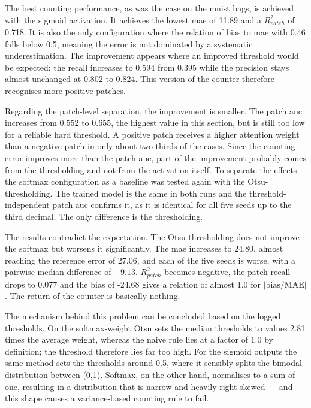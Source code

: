 \documentclass[12pt,parskip = half, DIV=classic,listof=totoc]{scrartcl}
\begin{document}
			The best counting performance, as was the case on the \ac{mnist} bags, is achieved with the sigmoid activation. It achieves
			the lowest \ac{mae} of 11.89 and a $R^2_{patch}$ of 0.718. It is also the only configuration where the relation of bias to \ac{mae} with 0.46
			falls below 0.5, meaning the error is not dominated by a systematic underestimation. The improvement appears
			where an improved threshold would be expected: the recall increases to 0.594 from 0.395 while the precision stays 
			almost unchanged at 0.802 to 0.824. This version of the counter therefore recognises more positive patches.
			
			Regarding the patch-level separation, the improvement is smaller. The patch \ac{auc} increases from 0.552 to 0.655, the highest value in this section,
			but is still too low for a reliable hard threshold. A positive patch receives a higher attention weight than a negative patch in only about two thirds
			of the cases. Since the counting error improves more than the patch \ac{auc}, part of the improvement probably comes from
			the thresholding and not from the activation itself. To separate the effects the softmax configuration as a baseline was tested 
			again with the Otsu-thresholding. The trained model 
			is the same in both runs and the threshold-independent patch \ac{auc} confirms it, as it is identical for all five seeds up to 
			the third decimal. The only difference is the thresholding.

			The results contradict the expectation. The Otsu-thresholding does not improve the softmax but worsens it significantly. The \ac{mae}
			increases to 24.80, almost reaching the reference error of 27.06, and each of the five seeds is worse, with a pairwise median difference of $+9.13$.
			$R^2_{patch}$ becomes negative, the patch recall drops to 0.077 and the bias of -24.68 gives a relation of almost 1.0 for $|\text{bias}/\text{MAE}|$. 
			The return of the counter is basically nothing.

			The mechanism behind this problem can be concluded based on the logged thresholds. On the softmax-weight Otsu 
			sets the median thresholds to values 2.81 times the average weight, whereas the naive rule lies at a factor 
			of 1.0 by definition; the threshold therefore lies far too high. For the sigmoid outputs the same method sets the 
			thresholds around 0.5, where it sensibly splits the bimodal distribution 
			between (0,1). Softmax, on the other hand, normalises to a sum of one, resulting in a distribution that is narrow and heavily right-skewed — and
			this shape causes a variance-based counting rule to fail.
\end{document}
